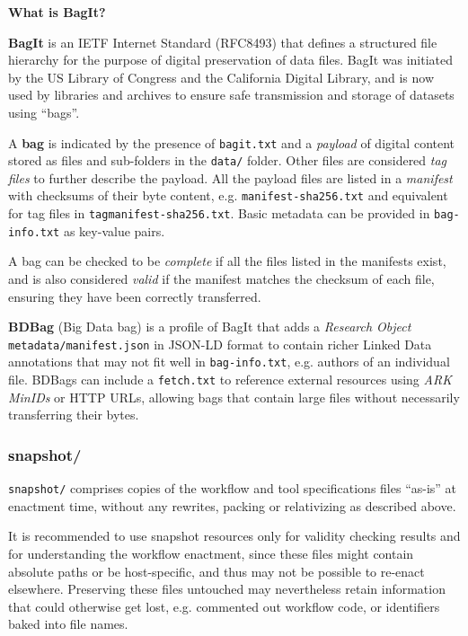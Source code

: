 \documentclass[a4paper,num-refs]{oup-contemporary}
\begin{document}
\begin{mdframed}[linewidth=1pt,linecolor=black,
  innerleftmargin=8pt,innerrightmargin=8pt,
  innertopmargin=8.2pt,innerbottommargin=6pt]
  {\fontsize{8.2pt}{10pt}\bfseries What is BagIt?\par}

\textbf{BagIt} is an IETF Internet Standard (RFC8493)\citep{bagit17} that defines a structured file hierarchy for the purpose of digital preservation of data files. BagIt was initiated by the US Library of Congress and the California Digital Library, and is now used by libraries and archives to ensure safe transmission and storage of datasets using ``bags''. 

A \textbf{bag} is indicated by the presence of \texttt{bagit.txt} and a \emph{payload} of digital content stored as files and sub-folders in the \texttt{data/} folder. Other files are considered  \emph{tag files} to further describe the payload. All the payload files are listed in a \emph{manifest} with checksums of their byte content, e.g. \texttt{manifest-sha256.txt} and equivalent for tag files in \texttt{tagmanifest-sha256.txt}. Basic metadata can be provided in \texttt{bag-info.txt} as key-value pairs. 

A bag can be checked to be \emph{complete} if all the files listed in the manifests exist, and is also considered \emph{valid} if the manifest matches the checksum of each file, ensuring they have been correctly transferred.

\textbf{BDBag} (Big Data bag)\citep{chard_2016} is a profile of BagIt that adds a \emph{Research Object}\citep{RObundle} \texttt{metadata/manifest.json} in JSON-LD \citep{JSONLD} format to contain richer Linked Data annotations that may not fit well in \texttt{bag-info.txt}, e.g. authors of an individual file. BDBags can include a \texttt{fetch.txt} to reference external resources using \emph{ARK MinIDs} or HTTP URLs, allowing bags that contain large files without necessarily transferring their bytes.
\end{mdframed}

\subsubsection{\textcolor{black}snapshot/}
\texttt{snapshot/} comprises copies of the workflow and tool specifications files “as-is” at enactment time, without any rewrites, packing or relativizing as described above.  

It is recommended to use snapshot resources only for validity checking  results and for understanding the workflow enactment, since these files might contain absolute paths or be host-specific, and thus may not be possible to re-enact elsewhere. Preserving these files untouched may nevertheless retain information that could otherwise get lost, e.g. commented out workflow code, or identifiers baked into file names.
\end{document}
